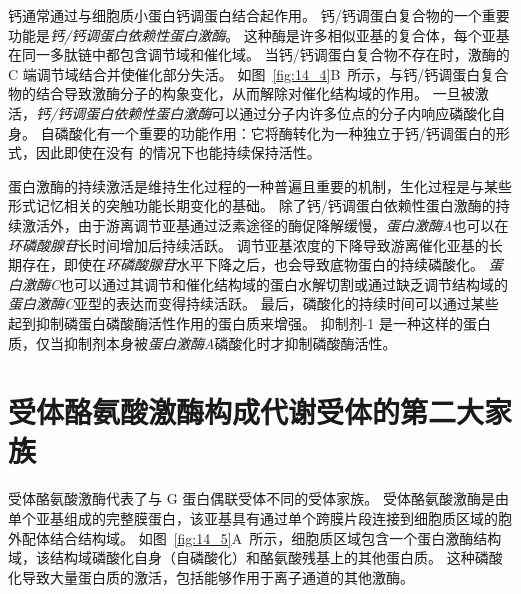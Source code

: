钙通常通过与细胞质小蛋白钙调蛋白结合起作用。
钙/钙调蛋白复合物的一个重要功能是\textit{钙/钙调蛋白依赖性蛋白激酶}。
这种酶是许多相似亚基的复合体，每个亚基在同一多肽链中都包含调节域和催化域。
当钙/钙调蛋白复合物不存在时，激酶的 C 端调节域结合并使催化部分失活。
如图~\ref{fig:14_4}B~所示，与钙/钙调蛋白复合物的结合导致激酶分子的构象变化，从而解除对催化结构域的作用。
一旦被激活，\textit{钙/钙调蛋白依赖性蛋白激酶}可以通过分子内许多位点的分子内响应磷酸化自身。
自磷酸化有一个重要的功能作用：它将酶转化为一种独立于钙/钙调蛋白的形式，因此即使在没有  的情况下也能持续保持活性。


蛋白激酶的持续激活是维持生化过程的一种普遍且重要的机制，生化过程是与某些形式记忆相关的突触功能长期变化的基础。
除了钙/钙调蛋白依赖性蛋白激酶的持续激活外，由于游离调节亚基通过泛素途径的酶促降解缓慢，\textit{蛋白激酶A}也可以在\textit{环磷酸腺苷}长时间增加后持续活跃。
调节亚基浓度的下降导致游离催化亚基的长期存在，即使在\textit{环磷酸腺苷}水平下降之后，也会导致底物蛋白的持续磷酸化。
\textit{蛋白激酶C}也可以通过其调节和催化结构域的蛋白水解切割或通过缺乏调节结构域的\textit{蛋白激酶C}亚型的表达而变得持续活跃。
最后，磷酸化的持续时间可以通过某些起到抑制磷蛋白磷酸酶活性作用的蛋白质来增强。
抑制剂-1 是一种这样的蛋白质，仅当抑制剂本身被\textit{蛋白激酶A}磷酸化时才抑制磷酸酶活性。



\section{受体酪氨酸激酶构成代谢受体的第二大家族}

受体酪氨酸激酶代表了与 G 蛋白偶联受体不同的受体家族。
受体酪氨酸激酶是由单个亚基组成的完整膜蛋白，该亚基具有通过单个跨膜片段连接到细胞质区域的胞外配体结合结构域。
如图~\ref{fig:14_5}A~所示，细胞质区域包含一个蛋白激酶结构域，该结构域磷酸化自身（自磷酸化）和酪氨酸残基上的其他蛋白质。
这种磷酸化导致大量蛋白质的激活，包括能够作用于离子通道的其他激酶。


